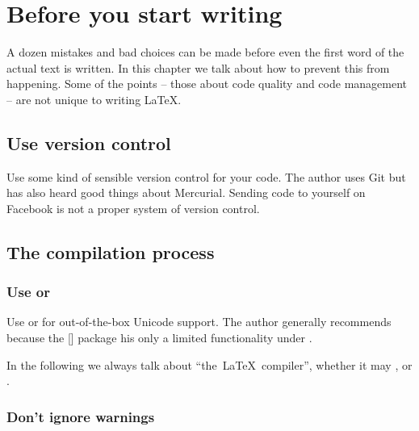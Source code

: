 \chapter{Before you start writing}

A dozen mistakes and bad choices can be made before even the first word of the actual text is written.
In this chapter we talk about how to prevent this from happening.
Some of the points -- those about code quality and code management -- are not unique to writing {\LaTeX}.




\section{Use version control}

Use some kind of sensible version control for your code.
The author uses Git but has also heard good things about Mercurial.
Sending code to yourself on Facebook is not a proper system of version control.





\section{The compilation process}



\subsection{Use \texorpdfstring{\XeLaTeX}{XeLaTeX} or \texorpdfstring{\LuaLaTeX}{LuaLaTeX}}

Use {\XeLaTeX} or {\LuaLaTeX} for out-of-the-box Unicode support.
The author generally recommends {\LuaLaTeX} because the [\packname] package his only a limited functionality under {\XeLaTeX}.

In the following we always talk about \enquote{the~{\LaTeX}~compiler}, whether it may ,  or .



\subsection{Don’t ignore warnings}

